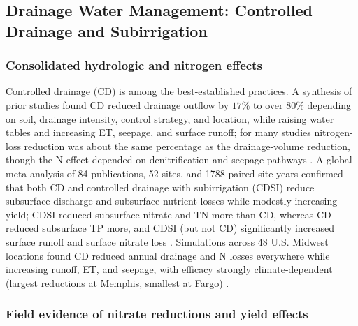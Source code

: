 \documentclass[11pt]{article}
\begin{document}
\subsection{Drainage Water Management: Controlled Drainage and Subirrigation}

\subsubsection{Consolidated hydrologic and nitrogen effects}

Controlled drainage (CD) is among the best-established practices. A
synthesis of prior studies found CD reduced drainage outflow by $17\%$ to
over $80\%$ depending on soil, drainage intensity, control strategy, and
location, while raising water tables and increasing ET, seepage, and
surface runoff; for many studies nitrogen-loss reduction was about the
same percentage as the drainage-volume reduction, though the N effect
depended on denitrification and seepage pathways \parencite{Skaggs2010}. A
global meta-analysis of 84 publications, 52 sites, and 1788 paired
site-years confirmed that both CD and controlled drainage with
subirrigation (CDSI) reduce subsurface discharge and subsurface nutrient
losses while modestly increasing yield; CDSI reduced subsurface nitrate
and TN more than CD, whereas CD reduced subsurface TP more, and CDSI (but
not CD) significantly increased surface runoff and surface nitrate loss
\parencite{Wu2025}. Simulations across 48 U.S. Midwest locations found CD
reduced annual drainage and N losses everywhere while increasing runoff,
ET, and seepage, with efficacy strongly climate-dependent (largest
reductions at Memphis, smallest at Fargo) \parencite{Youssef2018}.

\subsubsection{Field evidence of nitrate reductions and yield effects}
\end{document}
